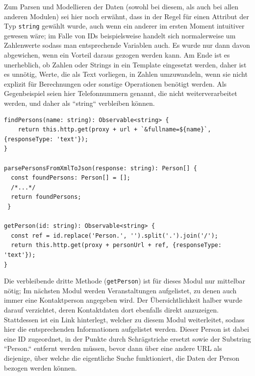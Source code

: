 Zum Parsen und Modellieren der Daten (sowohl bei diesem, als auch bei allen anderen Modulen) sei hier noch erwähnt, dass in der Regel für einen Attribut der Typ \texttt{string} gewählt wurde, auch wenn ein anderer im ersten Moment intuitiver gewesen wäre; im Falle von IDs beispielsweise handelt sich normalerweise um Zahlenwerte sodass man entsprechende Variablen auch. Es wurde nur dann davon abgewichen, wenn ein Vorteil daraus gezogen werden kann. Am Ende ist es unerheblich, ob Zahlen oder Strings in ein Template eingesetzt werden, daher ist es unnötig, Werte, die als Text vorliegen, in Zahlen umzuwandeln, wenn sie nicht explizit für Berechnungen oder sonstige Operationen benötigt werden. Als Gegenbeispiel seien hier Telefonnummern genannt, die nicht weiterverarbeitet werden, und daher als ``string`` verbleiben können.

\begin{lstlisting}[float, floatplacement=h, style=htmlcssjs, caption={Auszug aus PersonSearchService}, label={PersonSearchService}]
findPersons(name: string): Observable<string> {
    return this.http.get(proxy + url + `&fullname=${name}`, {responseType: 'text'});
}

parsePersonsFromXmlToJson(response: string): Person[] {
  const foundPersons: Person[] = [];
  /*...*/
  return foundPersons;
 }

getPerson(id: string): Observable<string> {
  const ref = id.replace('Person.', '').split('.').join('/');
  return this.http.get(proxy + personUrl + ref, {responseType: 'text'});
}

\end{lstlisting}
Die verbleibende dritte Methode (\texttt{getPerson}) ist für dieses Modul nur mittelbar nötig; Im nächsten Modul werden Veranstaltungen aufgelistet, zu denen auch immer eine Kontaktperson angegeben wird. Der Übersichtlichkeit halber wurde darauf verzichtet, deren Kontaktdaten dort ebenfalls direkt anzuzeigen. Stattdessen ist ein Link hinterlegt, welcher zu diesem Modul weiterleitet, sodass hier die entsprechenden Informationen aufgelistet werden. Dieser Person ist dabei eine ID zugeordnet, in der Punkte durch Schrägstriche ersetzt sowie der Substring ``Person.`` entfernt werden müssen, bevor dann über eine andere \acs{URL} als diejenige, über welche die eigentliche Suche funktioniert, die Daten der Person bezogen werden können.
 
